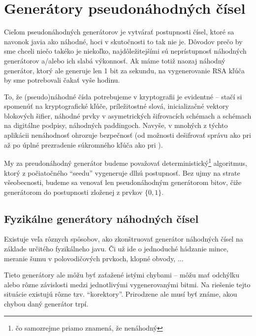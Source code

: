 \section{Generátory pseudonáhodných čísel}

Cieľom pseudonáhodných generátorov je vytvárať postupnosti čísel, ktoré sa
navonok javia ako náhodné, hoci v skutočnosti to tak nie je. Dôvodov prečo
by sme chceli niečo takéko je niekoľko, najdôležitejšími sú neprístupnosť
náhodných generátorov a/alebo ich slabá výkonnosť. Ak máme totiž naozaj
náhodný generátor, ktorý ale generuje len 1 bit za sekundu, na
vygenerovanie RSA kľúča by sme potrebovali čakať vyše hodinu.

To, že (pseudo)náhodné čísla potrebujeme v kryptografii je evidentné --
stačí si spomenúť na kryptografické kľúče, príležitostné slová,
inicializačné vektory blokových šifier, náhodné prvky v asymetrických
šifrovacích schémach a schémach na digitálne podpisy, náhodných paddingoch.
Navyše, v mnohých z týchto aplikácii nenáhodnosť ohrozuje bezpečnosť (od
možnosti dešifrovať správu ako pri \todo{} až po úplné prezradenie
súkromného kľúča ako pri \todo{}).

My za preudonáhodný generátor budeme považovať deterministický\footnote{
čo samozrejme priamo znamená, že nenáhodný} algoritmus, ktorý z
počiatočného ``seedu'' vygeneruje dlhú postupnosť. Bez ujmy na strate
všeobecnosti, budeme sa venovať len pseudonáhodným generátorom bitov, čiže
generátorom do postupnosti zloženej z prvkov $\{0,1\}$.

\subsection{Fyzikálne generátory náhodných čísel}
Existuje veľa rôznych spôsobov, ako zkonštruovať generátor náhodných čísel
na základe určitého fyzikálneho javu. Či už ide o jednoduché hádzanie
mince, meranie šumu v polovodičových prvkoch, klopné obvody, ...

Tieto generátory ale môžu byť zaťažené istými chybami -- môžu mať odchýlku
alebo rôzne závislosti medzi jednotlivými vygenerovanými bitmi. Na riešenie
tejto situácie existujú rôzne tzv. ``korektory''. Prirodzene ale musí byť
známe, akou chybou daný generátor trpí.

